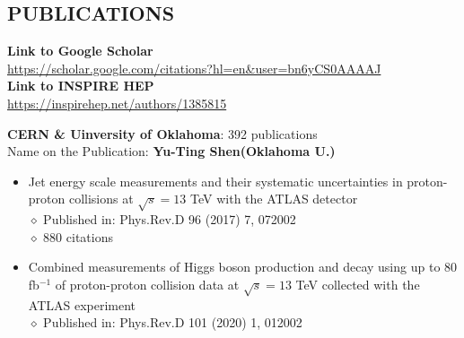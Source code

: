 \documentclass[margin, 10pt]{res} %
\begin{document}
\begin{resume}
\section{PUBLICATIONS}

\textbf{Link to Google Scholar}\\
\url{https://scholar.google.com/citations?hl=en&user=bn6yCS0AAAAJ}\\
\textbf{Link to INSPIRE HEP}\\
\url{https://inspirehep.net/authors/1385815}

\textbf{CERN \& Uinversity of Oklahoma}: 392 publications\\
\textrm{Name on the Publication: }\textbf{Yu-Ting Shen(Oklahoma U.)}\\
\begin{itemize}
\item Jet energy scale measurements and their systematic uncertainties in proton-proton collisions at $\sqrt{s} = 13$ TeV with the ATLAS detector\\
$\diamond$ Published in: Phys.Rev.D 96 (2017) 7, 072002\\
$\diamond$ 880 citations
\item Combined measurements of Higgs boson production and decay using up to 80 fb$^{-1}$ of proton-proton collision data at $\sqrt{s} = 13$ TeV collected with the ATLAS experiment\\
$\diamond$ Published in: Phys.Rev.D 101 (2020) 1, 012002\\

\end{itemize}
\end{resume}
\end{document}
